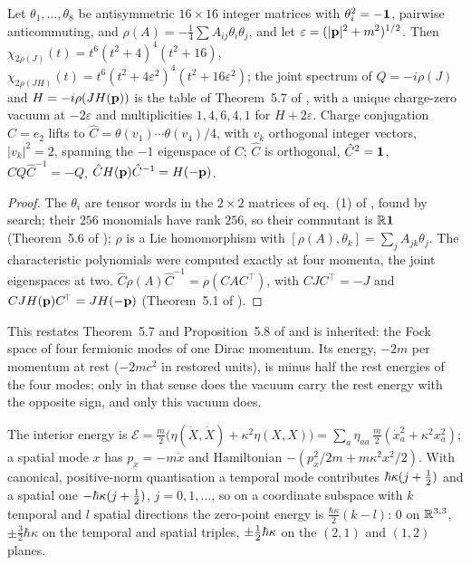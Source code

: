 \begin{proposition}
\label{d2:prop:fock}
Let $\theta_1,\dots,\theta_8$ be antisymmetric $16\times16$ integer matrices with $\theta_i^2=-\mathbf 1$, pairwise anticommuting, and
$\rho(A)=-\tfrac14\sum A_{ij}\theta_i\theta_j$, and let $\varepsilon=(|\mathbf p|^2+m^2)^{1/2}$. Then $\chi_{2\rho(J)}(t)=t^6(t^2+4)^4(t^2+16)$, $\chi_{2\rho(JH)}(t)=t^6(t^2+4\varepsilon^2)^4(t^2+16\varepsilon^2)$; the joint
spectrum of $Q=-i\rho(J)$ and $H=-i\rho(JH(\mathbf p))$ is the table of Theorem~5.7 of \cite{ES17}, with a unique charge-zero vacuum at $-2\varepsilon$ and
multiplicities $1,4,6,4,1$ for $H+2\varepsilon$. Charge conjugation $C=e_2$ lifts to $\hat C=\theta(v_1)\cdots\theta(v_4)/4$, with $v_k$ orthogonal
integer vectors, $|v_k|^2=2$, spanning the $-1$ eigenspace of $C$; $\hat C$ is orthogonal, $\hat C^2=\mathbf 1$, $\hat CQ\hat C^{-1}=-Q$,
$\hat CH(\mathbf p)\hat C^{-1}=H(-\mathbf p)$.
\end{proposition}

\begin{proof}
The $\theta_i$ are tensor words in the $2\times2$ matrices of eq.~(1) of \cite{ES17}, found by search; their $256$ monomials have rank $256$, so their
commutant is $\mathbb{R}\mathbf 1$ (Theorem~5.6 of \cite{ES17}); $\rho$ is a Lie homomorphism with $[\rho(A),\theta_k]=\sum_jA_{jk}\theta_j$. The characteristic polynomials were computed exactly at four momenta, the joint eigenspaces at
two. $\hat C\rho(A)\hat C^{-1}=\rho(CAC^{\!\top})$, with $CJC^{\!\top}=-J$ and $CJH(\mathbf p)C^{\!\top}=JH(-\mathbf p)$ (Theorem~5.1 of \cite{ES17}).
\end{proof}

This restates Theorem~5.7 and Proposition~5.8 of \cite{ES17} and is inherited: the Fock space of four fermionic modes of one Dirac momentum. Its
energy, $-2m$ per momentum at rest ($-2mc^2$ in restored units), is minus half the rest energies of the four modes; only in that sense does the vacuum
carry the rest energy with the opposite sign, and only this vacuum does.

\begin{proposition}
\label{d2:prop:framevac}
The interior energy is $\mathcal E=\tfrac m2\bigl(\eta(\dot X,\dot X)+\kappa^2\eta(X,X)\bigr)=\sum_a\eta_{aa}\,\tfrac m2(\dot x_a^2+\kappa^2x_a^2)$; a spatial
mode $x$ has $p_x=-m\dot x$ and Hamiltonian $-(p_x^2/2m+m\kappa^2x^2/2)$. With canonical, positive-norm quantisation a temporal mode contributes
$\hbar\kappa(j+\tfrac12)$ and a spatial one $-\hbar\kappa(j+\tfrac12)$, $j=0,1,\dots$, so on a coordinate subspace with $k$ temporal and $l$ spatial directions the zero-point
energy is $\tfrac{\hbar\kappa}2(k-l)$: $0$ on $\mathbb{R}^{3,3}$, $\pm\tfrac32\hbar\kappa$ on the temporal and spatial triples, $\pm\tfrac12\hbar\kappa$ on the
$(2,1)$ and $(1,2)$ planes.
\end{proposition}

